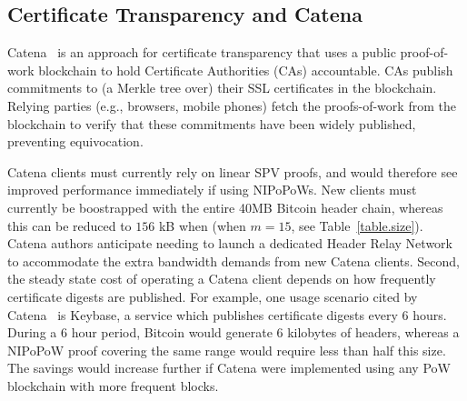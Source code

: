 \subsection{Certificate Transparency and Catena}
\label{sec:catena}
Catena~\cite{catena} is an approach for certificate transparency that uses a public proof-of-work blockchain to hold Certificate Authorities (CAs) accountable.
CAs publish commitments to (a Merkle tree over) their SSL certificates in the blockchain. 
Relying parties (e.g., browsers, mobile phones) fetch the proofs-of-work from the blockchain to verify that these commitments have been widely published, preventing equivocation.

Catena clients must currently rely on linear SPV proofs, and would therefore see improved performance immediately if using NIPoPoWs. New clients must currently be boostrapped with the entire 40MB Bitcoin header chain, whereas this can be reduced to $156$ kB when (when $m=15$, see Table~\ref{table.size}).
Catena authors anticipate needing to launch a dedicated
Header Relay Network~\cite{catena} to accommodate the extra bandwidth demands
from new Catena clients.
 Second, the steady state cost of operating a Catena client depends
on how frequently certificate digests are published. For example, one usage
scenario cited by Catena~\cite{catena} is Keybase, a service which publishes
certificate digests every 6 hours. During a 6 hour period, Bitcoin would
generate 6 kilobytes of headers, whereas a NIPoPoW proof covering the same range
would require less than half this size. The savings would increase further if
Catena were implemented using any PoW blockchain with more frequent blocks.
